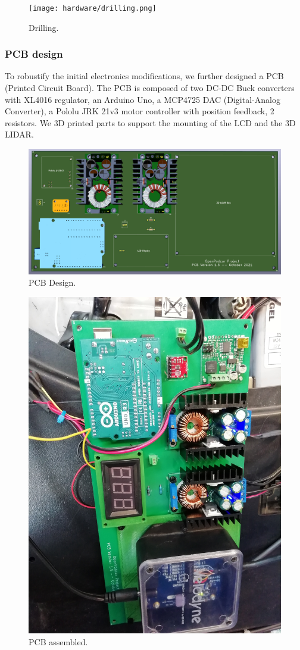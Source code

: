 \documentclass[a4paper]{article}
\begin{document}
\begin{figure}[h]
	\texttt{[image: hardware/drilling.png]}
	\caption{Drilling.}
	\label{fig:drilling}
\end{figure}

\subsubsection{PCB design}

To robustify the initial electronics modifications, we further designed a PCB (Printed Circuit Board). The PCB is composed of two DC-DC Buck converters with XL4016 regulator, an Arduino Uno, a MCP4725 DAC (Digital-Analog Converter), a Pololu JRK 21v3 motor controller with position feedback, 2 resistors. We 3D printed parts to support the mounting of the LCD and the 3D LIDAR.  


\begin{figure}[h]
	\includegraphics[width=\columnwidth]{hardware/pcb_version_1_5_pic1.png}
	\caption{PCB Design.}
	\label{fig:pcb_design}
\end{figure}


\begin{figure}[h]
	\includegraphics[width=0.75\columnwidth, angle=90]{hardware/pcb_podcar.jpg}
	\caption{PCB assembled.}
	\label{fig:pcb_assembled}
\end{figure}
\end{document}
